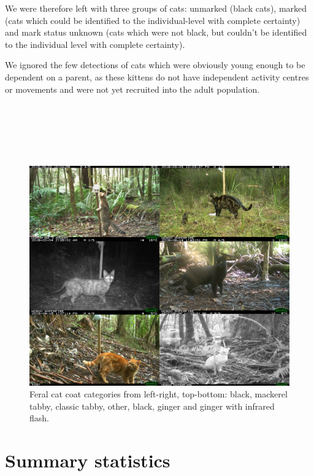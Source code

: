 \documentclass[11pt,a4paper,titlepage,twoside,openright]{style/unimelbthesis}
\begin{document}
\begin{mainmatter}
We were therefore left with three groups of cats: unmarked (black cats), marked (cats which could be identified to the individual-level with complete certainty) and mark status unknown (cats which were not black, but couldn't be identified to the individual level with complete certainty).

We ignored the few detections of cats which were obviously young enough to be dependent on a parent, as these kittens do not have independent activity centres or movements and were not yet recruited into the adult population.

\newpage

\(~\)

\(~\)

\(~\)
\begin{figure}

{\centering \includegraphics[width=1\linewidth]{figure/c3/cat_coats} 

}

\caption{Feral cat coat categories from left-right, top-bottom: black, mackerel tabby, classic tabby, other, black, ginger and ginger with infrared flash.}\label{fig:density-cat-photo}
\end{figure}
\newpage

\hypertarget{summary-statistics}{%
\section{Summary statistics}\label{summary-statistics}}


\end{mainmatter}
\end{document}
